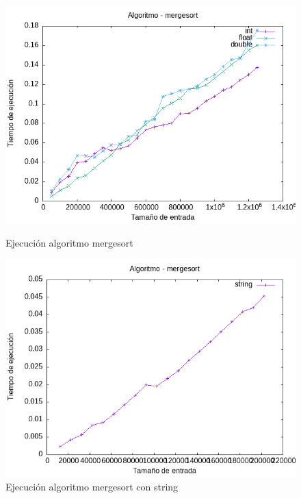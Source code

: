 \documentclass[11pt,openany]{book}
\begin{document}
\begin{figure}[H]
    \begin{minipage}{0.5\textwidth}
        \centering
        \includegraphics[width=\linewidth]{assets/Img/mergesort.png}
        \caption{Ejecución algoritmo mergesort}
        \label{fig:mergesort}
    \end{minipage}
    \begin{minipage}{0.5\textwidth}
        \centering
        \includegraphics[width=\linewidth]{assets/Img/mergesortstring.png}
        \caption{Ejecución algoritmo mergesort con string}
        \label{fig:quicksortstring}
    \end{minipage}
\end{figure}
\end{document}
